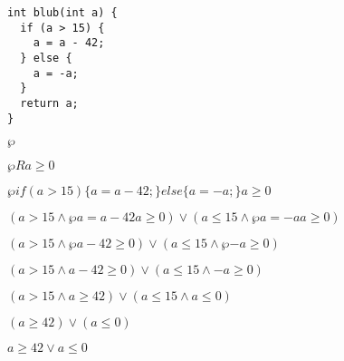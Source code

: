 \documentclass{lehramt-informatik-minimal}
\begin{document}
\begin{verbatim}
int blub(int a) {
  if (a > 15) {
    a = a - 42;
  } else {
    a = -a;
  }
  return a;
}
\end{verbatim}


$\wp{}{}$

$\wp{R}{a \geq 0}$

$\wp{if (a > 15) \{a = a - 42;\} else \{ a = -a;\}}{a \geq 0}$

$
(a > 15 \land \wp{a = a - 42}{a \geq 0})
\lor
(a \leq 15 \land \wp{a = -a}{a \geq 0})
$

$
(a > 15 \land \wp{}{a - 42 \geq 0})
\lor
(a \leq 15 \land \wp{}{-a \geq 0})
$

$
(a > 15 \land a - 42 \geq 0)
\lor
(a \leq 15 \land -a \geq 0)
$

$
(a > 15 \land a \geq 42)
\lor
(a \leq 15 \land a \leq 0)
$

$
(a \geq 42)
\lor
(a \leq 0)
$

$
a \geq 42
\lor
a \leq 0
$
\end{document}

